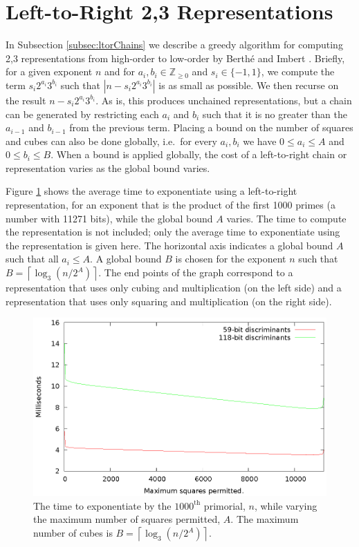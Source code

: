 \documentclass{ucalgthes1}
\theoremstyle{definition}
\newcommand{\ZZgez}{\mathbb{Z}_{\ge 0}}
\newcommand{\ceil}[1]{\left\lceil #1 \right\rceil}
\begin{document}
\section{Left-to-Right 2,3 Representations}
\label{sec:expL2RChains}

In Subsection \ref{subsec:ltorChains} we describe a greedy algorithm for computing 2,3 representations from high-order to low-order by Berth{\'e} and Imbert \cite{Berthe2009}.  Briefly, for a given exponent $n$ and for $a_i, b_i \in \ZZgez$ and \mbox{$s_i \in \{-1, 1\}$}, we compute the term $s_i2^{a_i}3^{b_i}$ such that $\left|n-s_i2^{a_i}3^{b_i}\right|$ is as small as possible.  We then recurse on the result $n - s_i2^{a_i}3^{b_i}$.  As is, this produces unchained representations, but a chain can be generated by restricting each $a_i$ and $b_i$ such that it is no greater than the $a_{i-1}$ and $b_{i-1}$ from the previous term.  Placing a bound on the number of squares and cubes can also be done globally, i.e.\ for every $a_i, b_i$ we have $0 \le a_i \le A$ and $0 \le b_i \le B$. When a bound is applied globally, the cost of a left-to-right chain or representation varies as the global bound varies.

Figure \ref{fig:dbnsL2rVaryBounds} shows the average time to exponentiate using a left-to-right representation, for an exponent that is the product of the first 1000 primes (a number with 11271 bits), while the global bound $A$ varies.  The time to compute the representation is not included; only the average time to exponentiate using the representation is given here.  The horizontal axis indicates a global bound $A$ such that all $a_i \le A$.  A global bound $B$ is chosen for the exponent $n$ such that $B = \ceil{\log_3(n/2^A)}$.  The end points of the graph correspond to a representation that uses only cubing and multiplication (on the left side) and a representation that uses only squaring and multiplication (on the right side).

\begin{figure}[htb]
\centering
\includegraphics{dbns_l2r_vary_max}
\caption[Global bounds on left-to-right 2,3 representations.]{The time to exponentiate by the $1000^{\textrm{th}}$ primorial, $n$, while varying the maximum number of squares permitted, $A$. The maximum number of cubes is $B = \ceil{\log_3(n/2^A)}$.}
\label{fig:dbnsL2rVaryBounds}
\end{figure}
\end{document}
